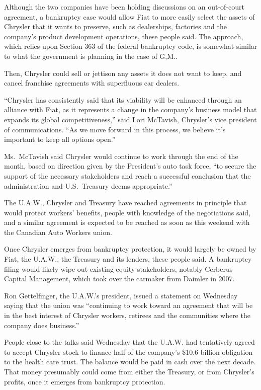 \documentclass[12pt,a4paper,onecolumn]{article}
\begin{document}
Although the two companies have been holding discussions on an out-of-court agreement, a bankruptcy
case would allow Fiat to more easily select the assets of Chrysler that it wants to preserve, such
as dealerships, factories and the company's product development operations, these people said. The
approach, which relies upon Section 363 of the federal bankruptcy code, is somewhat similar to what
the government is planning in the case of G,M..

Then, Chrysler could sell or jettison any assets it does not want to keep, and cancel franchise
agreements with superfluous car dealers.

``Chrysler has consistently said that its viability will be enhanced through an alliance with Fiat,
as it represents a change in the company's business model that expands its global competitiveness,''
said Lori McTavish, Chrysler's vice president of communications. ``As we move forward in this
process, we believe it's important to keep all options open.''

Ms.~McTavish said Chrysler would continue to work through the end of the month, based on direction
given by the President's auto task force, ``to secure the support of the necessary stakeholders and
reach a successful conclusion that the administration and U.S.~Treasury deems appropriate.''

The U.A.W., Chrysler and Treasury have reached agreements in principle that would protect workers'
benefits, people with knowledge of the negotiations said, and a similar agreement is expected to be
reached as soon as this weekend with the Canadian Auto Workers union.

Once Chrysler emerges from bankruptcy protection, it would largely be owned by Fiat, the U.A.W., the
Treasury and its lenders, these people said. A bankruptcy filing would likely wipe out existing
equity stakeholders, notably Cerberus Capital Management, which took over the carmaker from Daimler
in 2007.

Ron Gettelfinger, the U.A.W.'s president, issued a statement on Wednesday saying that the union was
``continuing to work toward an agreement that will be in the best interest of Chrysler workers,
retirees and the communities where the company does business.''

People close to the talks said Wednesday that the U.A.W. had tentatively agreed to accept Chrysler
stock to finance half of the company's \$10.6 billion obligation to the health care trust. The
balance would be paid in cash over the next decade. That money presumably could come from either the
Treasury, or from Chrysler's profits, once it emerges from bankruptcy protection.
\end{document}
